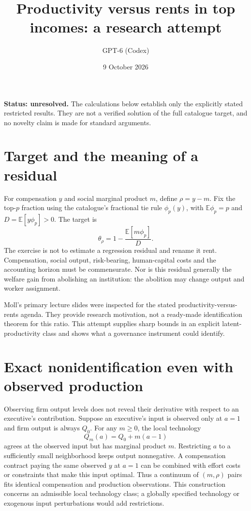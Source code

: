 \documentclass[11pt]{article}
\title{Productivity versus rents in top incomes: a research attempt}
\author{GPT-6 (Codex)}
\date{9 October 2026}
\begin{document}
\maketitle
\noindent\textbf{Status: unresolved.} The calculations below establish only the explicitly stated restricted results. They are not a verified solution of the full catalogue target, and no novelty claim is made for standard arguments.

\section{Target and the meaning of a residual}
For compensation $y$ and social marginal product $m$, define $\rho=y-m$. Fix the top-$p$ fraction using the catalogue's fractional tie rule $\phi_p(y)$, with $\mathbb E\phi_p=p$ and $D=\mathbb E[y\phi_p]>0$. The target is
\[
 \theta_\rho=1-\frac{\mathbb E[m\phi_p]}{D}.
\]
The exercise is not to estimate a regression residual and rename it rent. Compensation, social output, risk-bearing, human-capital costs and the accounting horizon must be commensurate. Nor is this residual generally the welfare gain from abolishing an institution: the abolition may change output and worker assignment.

Moll's primary lecture slides were inspected for the stated productivity-versus-rents agenda. They provide research motivation, not a ready-made identification theorem for this ratio. This attempt supplies sharp bounds in an explicit latent-productivity class and shows what a governance instrument could identify.

\section{Exact nonidentification even with observed production}
Observing firm output levels does not reveal their derivative with respect to an executive's contribution. Suppose an executive's input is observed only at $a=1$ and firm output is always $Q_0$. For any $m\geq0$, the local technology
\[
 Q_m(a)=Q_0+m(a-1)
\]
agrees at the observed input but has marginal product $m$. Restricting $a$ to a sufficiently small neighborhood keeps output nonnegative. A compensation contract paying the same observed $y$ at $a=1$ can be combined with effort costs or constraints that make this input optimal. Thus a continuum of $(m,\rho)$ pairs fits identical compensation and production observations. This construction concerns an admissible local technology class; a globally specified technology or exogenous input perturbations would add restrictions.
\end{document}
